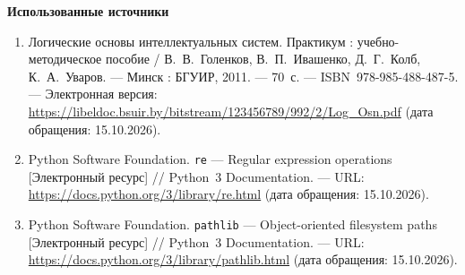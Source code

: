\documentclass[14pt,a4paper]{extarticle}
\newcommand{\reportheading}[1]{\par\vspace{0.8\baselineskip}\noindent\textbf{#1}\par\nobreak\vspace{0.35\baselineskip}\nobreak}
\begin{document}
\clearpage
\reportheading{Использованные источники}
\begin{enumerate}[itemsep=0.5\baselineskip]
\RaggedRight
\item\label{src:practice} Логические основы интеллектуальных систем. Практикум : учебно-методическое пособие / В.~В.~Голенков, В.~П.~Ивашенко, Д.~Г.~Колб, К.~А.~Уваров. --- Минск : БГУИР, 2011. --- 70~с. --- ISBN~978-985-488-487-5. --- Электронная версия: \url{https://libeldoc.bsuir.by/bitstream/123456789/992/2/Log_Osn.pdf} (дата обращения: 15.10.2026).
\item Python Software Foundation. \texttt{re} --- Regular expression operations [Электронный ресурс] // Python~3 Documentation. --- URL: \url{https://docs.python.org/3/library/re.html} (дата обращения: 15.10.2026).
\item Python Software Foundation. \texttt{pathlib} --- Object-oriented filesystem paths [Электронный ресурс] // Python~3 Documentation. --- URL: \url{https://docs.python.org/3/library/pathlib.html} (дата обращения: 15.10.2026).
\end{enumerate}
\end{document}
